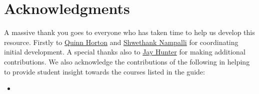 \chapter{Acknowledgments}
A massive thank you goes to everyone who has taken time to help us develop this resource. Firstly to \href{https://www.linkedin.com/in/quinn-horton/}{Quinn Horton} and \href{https://www.linkedin.com/in/shwethank-nampalli-686782225/}{Shwethank Nampalli} for coordinating initial development. A special thanks also to \href{https://www.linkedin.com/in/jay-k-hunter/}{Jay Hunter} for making additional contributions.
We also acknowledge the contributions of the following in helping to provide student insight towards the courses listed in the guide:
\begin{itemize}
    \item 
\end{itemize}
